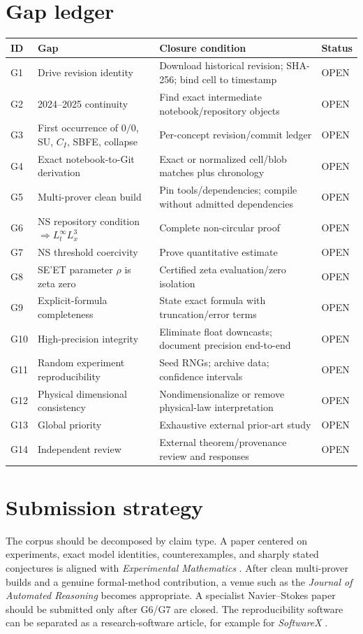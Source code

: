 \documentclass[11pt]{article}
\begin{document}
\section{Gap ledger}
\begin{longtable}{@{}p{}p{}p{}p{}@{}}
\toprule ID & Gap & Closure condition & Status \\ \midrule \endhead
G1 & Drive revision identity & Download historical revision; SHA-256; bind cell to timestamp & OPEN\\
G2 & 2024--2025 continuity & Find exact intermediate notebook/repository objects & OPEN\\
G3 & First occurrence of $0/0$, SU, $C_I$, SBFE, collapse & Per-concept revision/commit ledger & OPEN\\
G4 & Exact notebook-to-Git derivation & Exact or normalized cell/blob matches plus chronology & OPEN\\
G5 & Multi-prover clean build & Pin tools/dependencies; compile without admitted dependencies & OPEN\\
G6 & NS repository condition $\Rightarrow L^\infty_tL^3_x$ & Complete non-circular proof & OPEN\\
G7 & NS threshold coercivity & Prove quantitative estimate & OPEN\\
G8 & SE'ET parameter $\rho$ is zeta zero & Certified zeta evaluation/zero isolation & OPEN\\
G9 & Explicit-formula completeness & State exact formula with truncation/error terms & OPEN\\
G10 & High-precision integrity & Eliminate float downcasts; document precision end-to-end & OPEN\\
G11 & Random experiment reproducibility & Seed RNGs; archive data; confidence intervals & OPEN\\
G12 & Physical dimensional consistency & Nondimensionalize or remove physical-law interpretation & OPEN\\
G13 & Global priority & Exhaustive external prior-art study & OPEN\\
G14 & Independent review & External theorem/provenance review and responses & OPEN\\
\bottomrule
\end{longtable}

\section{Submission strategy}
The corpus should be decomposed by claim type. A paper centered on experiments, exact model identities, counterexamples, and sharply stated conjectures is aligned with \emph{Experimental Mathematics} \cite{ExperimentalMathScope}. After clean multi-prover builds and a genuine formal-method contribution, a venue such as the \emph{Journal of Automated Reasoning} becomes appropriate. A specialist Navier--Stokes paper should be submitted only after G6/G7 are closed. The reproducibility software can be separated as a research-software article, for example for \emph{SoftwareX} \cite{SoftwareXScope}.
\end{document}
